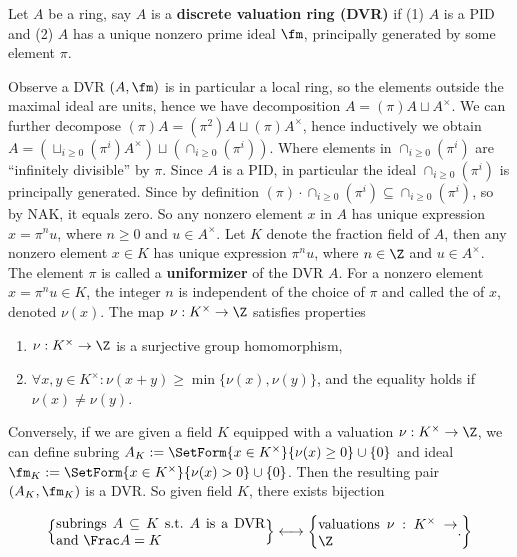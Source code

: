 \documentclass[11pt]{amsart}
\begin{document}
\begin{defn}[DVR] 
    Let $A$ be a ring, say $A$ is a {\bf discrete valuation ring (DVR)} if (1)
    $A$ is a PID and (2) $A$ has a unique nonzero prime ideal $\fm$, principally
    generated by some element $\pi$.
\end{defn}

Observe a DVR $(A, \fm)$ is in particular a local ring, so the elements outside
the maximal ideal are units, hence we have decomposition $A = (\pi)A \sqcup
A^{\times}$.  We can further decompose $(\pi)A = (\pi^2)A \sqcup
(\pi)A^{\times}$, hence inductively we obtain $A = (\sqcup_{i \geq 0}
(\pi^i)A^{\times}) \sqcup (\cap_{i \geq 0} (\pi^i))$.  Where elements in
$\cap_{i \geq 0} (\pi^i)$ are ``infinitely divisible'' by $\pi$.  Since $A$ is a
PID, in particular the ideal $\cap_{i\geq 0} (\pi^i)$ is principally generated.
Since by definition $(\pi) \cdot \cap_{i\geq 0} (\pi^i) \subseteq \cap_{i\geq 0}
(\pi^i)$, so by NAK, it equals zero.  So any nonzero element $x$ in $A$ has unique
expression $x = \pi^n u$, where $n \geq 0$ and $u \in A^{\times}$.  Let $K$
denote the fraction field of $A$, then any nonzero element $x \in K$ has unique
expression $\pi^n u$, where $n \in \Z$ and $u \in A^{\times}$.  The element
$\pi$ is called a  {\bf uniformizer} of the DVR $A$.  For a
nonzero element $x = \pi^n u \in K$, the integer $n$ is independent of the
choice of $\pi$ and called the  of $x$, denoted $\nu(x)$.  The map $\nu : K^{\times} \to \Z$
satisfies properties

\begin{enumerate}
    \item $\nu : K^{\times} \to \Z$ is a surjective group homomorphism,
    \item $\forall x,y \in K^{\times}: \nu(x+y) \geq \min \{\nu(x), \nu(y)\}$,
        and the equality holds if $\nu(x) \neq \nu(y)$.
\end{enumerate}

Conversely, if we are given a field $K$ equipped with a valuation $\nu :
K^{\times} \to \Z$, we can define subring $A_K := \SetForm{x \in
    K^{\times}}{\nu(x) \geq 0} \cup \{0\}$ and ideal $\fm_K := \SetForm{x \in
    K^{\times}}{\nu(x) > 0} \cup \{0\}$.  Then the resulting pair $(A_K, \fm_K)$ is
a DVR.  So given field $K$, there exists bijection

\[
    \left\{\parbox{15em}{
            subrings $A \subseteq K$ s.t.~$A$ is a DVR and $\Frac A = K$
        }\right\}
      \longleftrightarrow
      \left\{\parbox{10em}{valuations $\nu : K^{\times} \to \Z$}.
          \right\}
\]
\end{document}
